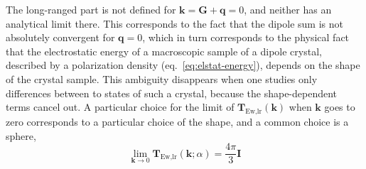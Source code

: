 The long-ranged part is not defined for $\mathbf k=\mathbf G+\mathbf q=0$, and neither has an analytical limit there.
This corresponds to the fact that the dipole sum is not absolutely convergent for $\mathbf q=0$, which in turn corresponds to the physical fact that the electrostatic energy of a macroscopic sample of a dipole crystal, described by a polarization density (eq.~\ref{eq:elstat-energy}), depends on the shape of the crystal sample.
This ambiguity disappears when one studies only differences between to states of such a crystal, because the shape-dependent terms cancel out.
A particular choice for the limit of $\mathbf T_\text{Ew,lr}(\mathbf k)$ when $\mathbf k$ goes to zero corresponds to a particular choice of the shape, and a common choice is a sphere,
\begin{equation}
  \lim_{\mathbf k\rightarrow0}\mathbf T_\text{Ew,lr}(\mathbf k;\alpha)=\frac{4\pi}3\mathbf I
\end{equation}
